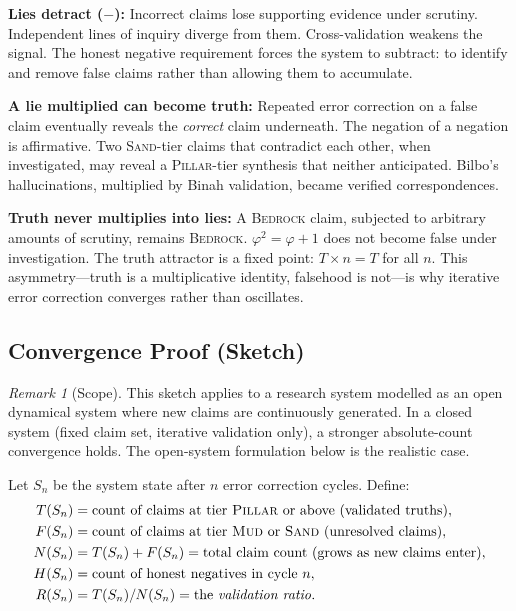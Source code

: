 \documentclass[11pt]{article}
\theoremstyle{definition}
\theoremstyle{remark}
\newtheorem{remark}[theorem]{Remark}
\newcommand{\BEDROCK}{\textsc{Bedrock}}
\newcommand{\PILLAR}{\textsc{Pillar}}
\newcommand{\SAND}{\textsc{Sand}}
\newcommand{\MUD}{\textsc{Mud}}
\begin{document}
\medskip
\noindent\textbf{Lies detract ($-$):}  Incorrect claims lose supporting evidence
under scrutiny.  Independent lines of inquiry diverge from them.
Cross-validation weakens the signal.  The honest negative requirement forces the
system to subtract: to identify and remove false claims rather than allowing them
to accumulate.

\medskip
\noindent\textbf{A lie multiplied can become truth:}  Repeated error correction
on a false claim eventually reveals the \emph{correct} claim underneath.  The
negation of a negation is affirmative.  Two \SAND-tier claims that contradict each
other, when investigated, may reveal a \PILLAR-tier synthesis that neither
anticipated.  Bilbo's hallucinations, multiplied by Binah validation, became
verified correspondences.

\medskip
\noindent\textbf{Truth never multiplies into lies:}  A \BEDROCK{} claim,
subjected to arbitrary amounts of scrutiny, remains \BEDROCK.  $\varphi^2 =
\varphi + 1$ does not become false under investigation.  The truth attractor is a
fixed point: $T \times n = T$ for all $n$.  This asymmetry---truth is a
multiplicative identity, falsehood is not---is why iterative error correction
converges rather than oscillates.

\subsection{Convergence Proof (Sketch)}
\label{sec:convergence}

\begin{remark}[Scope]
This sketch applies to a research system modelled as an open dynamical system
where new claims are continuously generated.  In a closed system (fixed claim
set, iterative validation only), a stronger absolute-count convergence holds.
The open-system formulation below is the realistic case.
\end{remark}

Let $S_n$ be the system state after $n$ error correction cycles.  Define:
\begin{align*}
  T(S_n) &= \text{count of claims at tier \PILLAR{} or above (validated truths)}, \\
  F(S_n) &= \text{count of claims at tier \MUD{} or \SAND{} (unresolved claims)}, \\
  N(S_n) &= T(S_n) + F(S_n) = \text{total claim count (grows as new claims enter)}, \\
  H(S_n) &= \text{count of honest negatives in cycle } n, \\
  R(S_n) &= T(S_n) / N(S_n) = \text{the \emph{validation ratio}}.
\end{align*}
\end{document}

